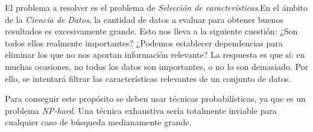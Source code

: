 El problema a resolver es el problema de \emph{Selección de características}.En el ámbito de la \emph{Ciencia de Datos}, la cantidad de datos a evaluar para obtener buenos resultados es excesivamente grande. Esto nos lleva a la siguiente cuestión: ¿Son todos ellos realmente importantes? ¿Podemos establecer dependencias para eliminar los que no nos aportan información relevante? La respuesta es que sí: en muchas ocasiones, no todos los datos son importantes, o no lo son demasiado. Por ello, se intentará filtrar las características relevantes de un conjunto de datos.

Para conseguir este propósito se deben usar técnicas probabilísticas, ya que es un problema \emph{NP-hard}. Una técnica exhaustiva sería totalmente inviable para cualquier caso de búsqueda medianamente grande.
